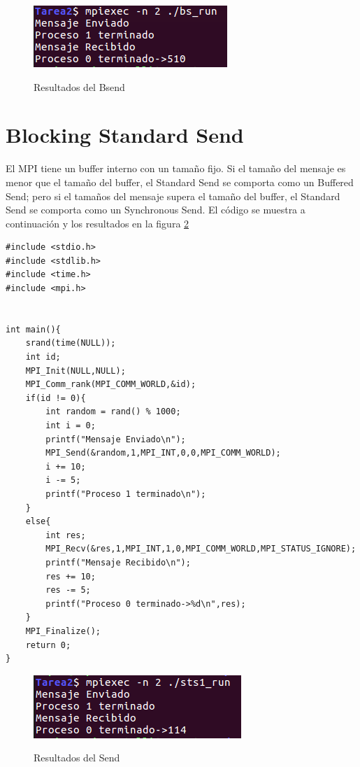 \documentclass[a4paper,12pt]{article}
\begin{document}
\begin{figure}
  \centering
  \includegraphics[scale = 0.7]{3.png}
  \label{fig:3}
  \caption{Resultados del Bsend}
\end{figure}

\section{Blocking Standard Send}

El MPI tiene un buffer interno con un tamaño fijo. Si el tamaño del mensaje es menor que el tamaño del buffer, el Standard Send
se comporta como un Buffered Send; pero si el tamaños del mensaje supera el tamaño del buffer, el Standard Send se comporta
como un Synchronous Send. El código se muestra a continuación y los resultados en la figura  \ref{fig:4}

\begin{lstlisting}
#include <stdio.h>
#include <stdlib.h>
#include <time.h>
#include <mpi.h>


int main(){
	srand(time(NULL));
	int id;
	MPI_Init(NULL,NULL);
	MPI_Comm_rank(MPI_COMM_WORLD,&id);
	if(id != 0){
		int random = rand() % 1000;
		int i = 0;
		printf("Mensaje Enviado\n");
		MPI_Send(&random,1,MPI_INT,0,0,MPI_COMM_WORLD);
		i += 10;
		i -= 5;
		printf("Proceso 1 terminado\n");
	}
	else{
		int res;
		MPI_Recv(&res,1,MPI_INT,1,0,MPI_COMM_WORLD,MPI_STATUS_IGNORE);
		printf("Mensaje Recibido\n");
		res += 10;
		res -= 5;
		printf("Proceso 0 terminado->%d\n",res);
	}
	MPI_Finalize();
	return 0;
}
\end{lstlisting}

\begin{figure}
  \centering
  \includegraphics[scale = 0.7]{4.png}
  \label{fig:4}
  \caption{Resultados del Send}
\end{figure}
\end{document}
